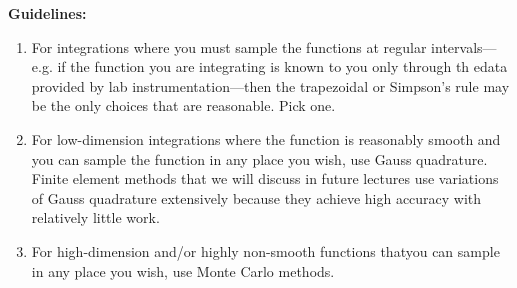 \vspace{0.1cm}

\noindent\textbf{Guidelines:}
\begin{enumerate}
\item For integrations where you must sample the functions at regular intervals---e.g. if the function you are integrating is known to you only through th edata provided by lab instrumentation---then the trapezoidal or Simpson's rule may be the only choices that are reasonable.  Pick one.

\item For low-dimension integrations where the function is reasonably smooth and you can sample the function in any place you wish, use Gauss quadrature.  Finite element methods that we will discuss in future lectures use variations of Gauss quadrature extensively because they achieve high accuracy with relatively little work.

\item For high-dimension and/or highly non-smooth functions thatyou can sample in any place you wish, use Monte Carlo methods.  
\end{enumerate}
